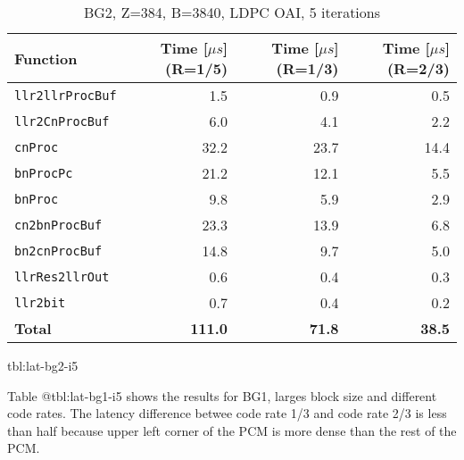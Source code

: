 \documentclass{article}
\begin{document}
\begin{table}[ht]
  \centering
  \begin{tabular}{lrrr}
    \toprule
    \textbf{Function} & \textbf{Time [$\mu s$] (R=1/5)} & \textbf{Time [$\mu s$] (R=1/3)} & \textbf{Time [$\mu s$] (R=2/3)}\\
    \midrule
    \texttt{llr2llrProcBuf} & 1.5  & 0.9  & 0.5  \\
    \texttt{llr2CnProcBuf}  & 6.0  & 4.1  & 2.2  \\
    \texttt{cnProc}         & 32.2 & 23.7 & 14.4 \\
    \texttt{bnProcPc}       & 21.2 & 12.1 & 5.5  \\
    \texttt{bnProc}         & 9.8  & 5.9  & 2.9  \\
    \texttt{cn2bnProcBuf}   & 23.3 & 13.9 & 6.8  \\
    \texttt{bn2cnProcBuf}   & 14.8 & 9.7  & 5.0  \\
    \texttt{llrRes2llrOut}  & 0.6  & 0.4  & 0.3  \\
    \texttt{llr2bit}        & 0.7  & 0.4  & 0.2  \\
    \midrule
    \textbf{Total}          & \textbf{111.0} & \textbf{71.8} & \textbf{38.5} \\
    \bottomrule
  \end{tabular}
  \caption{BG2, Z=384, B=3840, LDPC OAI, 5 iterations}
\end{table}{tbl:lat-bg2-i5}

Table {@tbl:lat-bg1-i5} shows the results for BG1, larges block size and different code rates. The latency difference betwee code rate 1/3 and code rate 2/3 is less than half because upper left corner of the PCM is more dense than the rest of the PCM.
\end{document}
